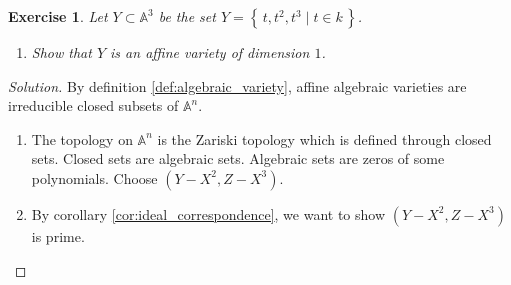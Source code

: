 \documentclass[11pt]{book}
\newtheorem{exercise}{Exercise}[section]
\newenvironment{solution}
  {\renewcommand{\qedsymbol}{}\begin{proof}[Solution]}
  {\end{proof}}
\theoremstyle{definition}
\numberwithin{equation}{section}
\newcommand{\makeset}[2]{\left\{\, #1 \mathrel{\mid} #2 \,\right\}}
\begin{document}
% 
\begin{exercise}
    Let \(Y \subset \mathbb{A}^3\) be the set \(Y = \makeset{t, t^2, t^3}{t \in k}\).
    \begin{enumerate}
        \item Show that \(Y\) is an affine variety of dimension \(1\).
    \end{enumerate}
\end{exercise}
\begin{solution}
    By definition \ref{def:algebraic_variety}, affine algebraic varieties are irreducible closed subsets of \(\mathbb{A}^n\).
    \begin{enumerate}
        \item The topology on \(\mathbb{A}^n\) is the Zariski topology which is defined through closed sets. Closed sets are algebraic sets. Algebraic sets are zeros of some polynomials. Choose \((Y - X^2, Z - X^3)\).
        \item By corollary \ref{cor:ideal_correspondence}, we want to show \((Y - X^2, Z - X^3)\) is prime.
    \end{enumerate}
\end{solution}
\printbibliography
\end{document}
